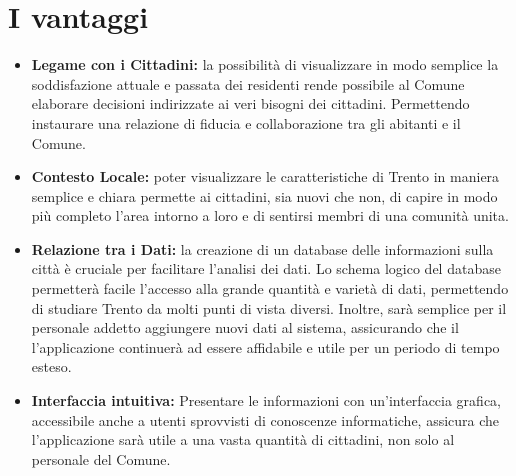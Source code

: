 \section{I vantaggi}
    \begin{itemize}
        \item \textbf{Legame con i Cittadini:} la possibilità di visualizzare in modo semplice la soddisfazione attuale e passata dei residenti rende possibile al Comune elaborare decisioni indirizzate ai veri bisogni dei cittadini. Permettendo instaurare una relazione di fiducia e collaborazione tra gli abitanti e il Comune.
        \item \textbf{Contesto Locale:} poter visualizzare le caratteristiche di Trento in maniera semplice e chiara permette ai cittadini, sia nuovi che non, di capire in modo più completo l'area intorno a loro e di sentirsi membri di una comunità unita.
        \item \textbf{Relazione tra i Dati:} la creazione di un database delle informazioni sulla città è cruciale per facilitare l'analisi dei dati. Lo schema logico del database permetterà facile l'accesso alla grande quantità e varietà di dati, permettendo di studiare Trento da molti punti di vista diversi. Inoltre, sarà semplice per il personale addetto aggiungere nuovi dati al sistema, assicurando che il l'applicazione continuerà ad essere affidabile e utile per un periodo di tempo esteso.
        \item \textbf{Interfaccia intuitiva:} Presentare le informazioni con un'interfaccia grafica, accessibile anche a utenti sprovvisti di conoscenze informatiche, assicura che l'applicazione sarà utile a una vasta quantità di cittadini, non solo al personale del Comune.
    \end{itemize}